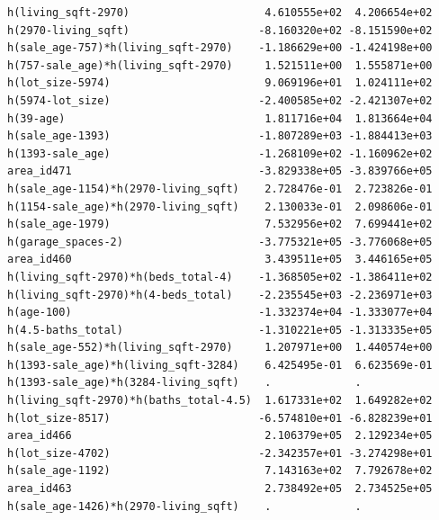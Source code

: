 \documentclass[
]{article}
\begin{document}
\begin{verbatim}
h(living_sqft-2970)                     4.610555e+02  4.206654e+02
h(2970-living_sqft)                    -8.160320e+02 -8.151590e+02
h(sale_age-757)*h(living_sqft-2970)    -1.186629e+00 -1.424198e+00
h(757-sale_age)*h(living_sqft-2970)     1.521511e+00  1.555871e+00
h(lot_size-5974)                        9.069196e+01  1.024111e+02
h(5974-lot_size)                       -2.400585e+02 -2.421307e+02
h(39-age)                               1.811716e+04  1.813664e+04
h(sale_age-1393)                       -1.807289e+03 -1.884413e+03
h(1393-sale_age)                       -1.268109e+02 -1.160962e+02
area_id471                             -3.829338e+05 -3.839766e+05
h(sale_age-1154)*h(2970-living_sqft)    2.728476e-01  2.723826e-01
h(1154-sale_age)*h(2970-living_sqft)    2.130033e-01  2.098606e-01
h(sale_age-1979)                        7.532956e+02  7.699441e+02
h(garage_spaces-2)                     -3.775321e+05 -3.776068e+05
area_id460                              3.439511e+05  3.446165e+05
h(living_sqft-2970)*h(beds_total-4)    -1.368505e+02 -1.386411e+02
h(living_sqft-2970)*h(4-beds_total)    -2.235545e+03 -2.236971e+03
h(age-100)                             -1.332374e+04 -1.333077e+04
h(4.5-baths_total)                     -1.310221e+05 -1.313335e+05
h(sale_age-552)*h(living_sqft-2970)     1.207971e+00  1.440574e+00
h(1393-sale_age)*h(living_sqft-3284)    6.425495e-01  6.623569e-01
h(1393-sale_age)*h(3284-living_sqft)    .             .           
h(living_sqft-2970)*h(baths_total-4.5)  1.617331e+02  1.649282e+02
h(lot_size-8517)                       -6.574810e+01 -6.828239e+01
area_id466                              2.106379e+05  2.129234e+05
h(lot_size-4702)                       -2.342357e+01 -3.274298e+01
h(sale_age-1192)                        7.143163e+02  7.792678e+02
area_id463                              2.738492e+05  2.734525e+05
h(sale_age-1426)*h(2970-living_sqft)    .             .           
                                                                  

\end{verbatim}
\end{document}
